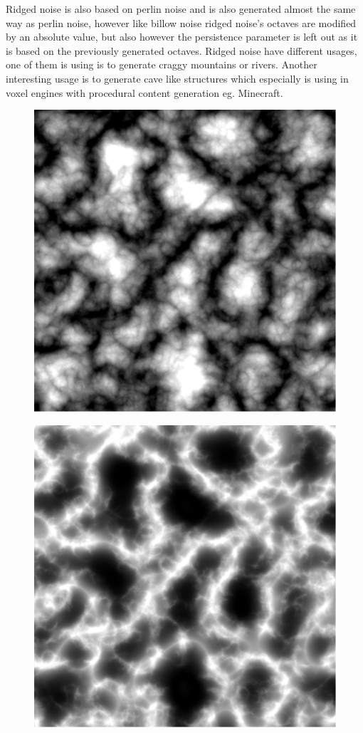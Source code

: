 Ridged noise is also based on perlin noise and is also generated almost the same way as perlin noise, however like billow noise ridged noise's octaves are modified by an absolute value\cite{NoiseMachineMakingNoise}, but also however the persistence parameter is left out as it is based on the previously generated octaves\cite{libnoiseRidged}. Ridged noise have different usages, one of them is using is to generate craggy mountains or rivers. Another interesting usage is to generate cave like structures which especially is using in voxel engines with procedural content generation eg. Minecraft.

\begin{figure}[H]
	\begin{minipage}[b]{.49\linewidth}
		\includegraphics[width=0.95\linewidth]{img/Billow}
		\label{fig:4a}
	\end{minipage}
	\begin{minipage}[b]{.49\linewidth}
		\includegraphics[width=0.95\linewidth]{img/Ridged}

\end{minipage}
\end{figure}
